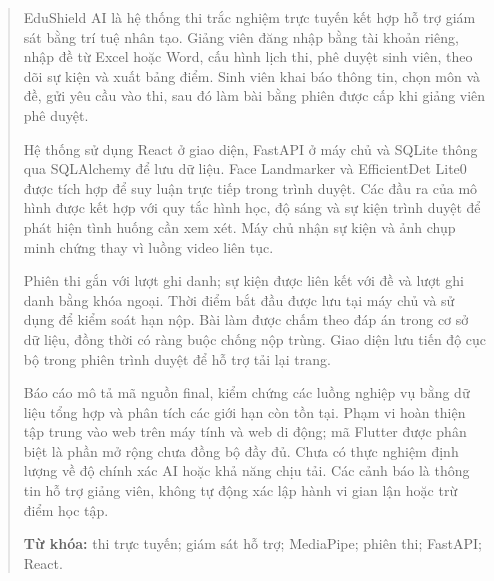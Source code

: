 \begin{abstract}
EduShield AI là hệ thống thi trắc nghiệm trực tuyến kết hợp hỗ trợ giám sát bằng trí tuệ nhân tạo. Giảng viên đăng nhập bằng tài khoản riêng, nhập đề từ Excel hoặc Word, cấu hình lịch thi, phê duyệt sinh viên, theo dõi sự kiện và xuất bảng điểm. Sinh viên khai báo thông tin, chọn môn và đề, gửi yêu cầu vào thi, sau đó làm bài bằng phiên được cấp khi giảng viên phê duyệt.

Hệ thống sử dụng React ở giao diện, FastAPI ở máy chủ và SQLite thông qua SQLAlchemy để lưu dữ liệu. Face Landmarker và EfficientDet Lite0 được tích hợp để suy luận trực tiếp trong trình duyệt. Các đầu ra của mô hình được kết hợp với quy tắc hình học, độ sáng và sự kiện trình duyệt để phát hiện tình huống cần xem xét. Máy chủ nhận sự kiện và ảnh chụp minh chứng thay vì luồng video liên tục.

Phiên thi gắn với lượt ghi danh; sự kiện được liên kết với đề và lượt ghi danh bằng khóa ngoại. Thời điểm bắt đầu được lưu tại máy chủ và sử dụng để kiểm soát hạn nộp. Bài làm được chấm theo đáp án trong cơ sở dữ liệu, đồng thời có ràng buộc chống nộp trùng. Giao diện lưu tiến độ cục bộ trong phiên trình duyệt để hỗ trợ tải lại trang.

Báo cáo mô tả mã nguồn final, kiểm chứng các luồng nghiệp vụ bằng dữ liệu tổng hợp và phân tích các giới hạn còn tồn tại. Phạm vi hoàn thiện tập trung vào web trên máy tính và web di động; mã Flutter được phân biệt là phần mở rộng chưa đồng bộ đầy đủ. Chưa có thực nghiệm định lượng về độ chính xác AI hoặc khả năng chịu tải. Các cảnh báo là thông tin hỗ trợ giảng viên, không tự động xác lập hành vi gian lận hoặc trừ điểm học tập.

\noindent\textbf{Từ khóa:} thi trực tuyến; giám sát hỗ trợ; MediaPipe; phiên thi; FastAPI; React.
\end{abstract}

